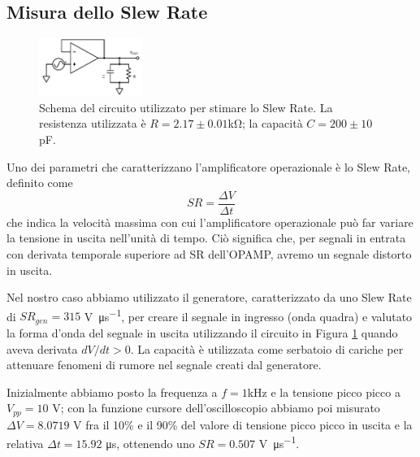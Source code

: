 \subsection{Misura dello Slew Rate}

\begin{figure}
  \begin{center}
    \includegraphics[width=0.30\textwidth]{../E03/latex/slew_rate.pdf}
  \end{center}
  \caption{Schema del circuito utilizzato per stimare lo Slew Rate. La resistenza utilizzata è $R=2.17\pm0.01$\si{\kilo\ohm}; la capacità $C=200 \pm 10$ \si{\pico\farad}.}
  \label{cir3:slew_rate}
\end{figure}

Uno dei parametri che caratterizzano l'amplificatore operazionale è lo Slew Rate, definito come
$$SR = \frac{\Delta V}{\Delta t}$$
che indica la velocità massima con cui l'amplificatore operazionale può far variare la tensione in uscita nell'unità di tempo. Ciò significa che, per segnali in entrata con derivata temporale superiore ad SR dell'OPAMP, avremo un segnale distorto in uscita.

Nel nostro caso abbiamo utilizzato il generatore, caratterizzato da uno Slew Rate di $SR_{gen}=315$ \si{\volt\per\micro\second}, per creare il segnale in ingresso (onda quadra) e valutato la forma d'onda del segnale in uscita utilizzando il circuito in Figura \ref{cir3:slew_rate} quando aveva derivata $dV/dt > 0$. La capacità è utilizzata come serbatoio di cariche per attenuare fenomeni di rumore nel segnale creati dal generatore.

Inizialmente abbiamo posto la frequenza a $f=1$\si{\kilo\hertz} e la tensione picco picco a $V_{pp}=10$ \si{\volt}; con la funzione cursore dell'oscilloscopio abbiamo poi misurato $\Delta V = 8.0719$ \si{\volt} fra il 10\% e il 90\% del valore di tensione picco picco in uscita e la relativa $\Delta t = 15.92$ \si{\micro\second}, ottenendo uno $SR=0.507$ \si{\volt\per\micro\second}.

